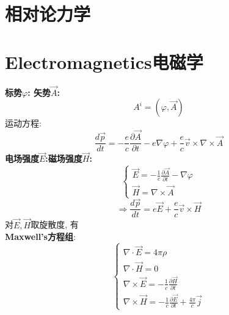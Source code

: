 \documentclass{article}
\begin{document}
\section{相对论力学}



\section{Electromagnetics电磁学}

\textbf{标势$\varphi$: \quad 矢势$\vec A$:}
\[A^{i}=(\varphi,\vec A)\]
运动方程:
\[\frac{d\vec p}{dt} = - \frac{e}{c} \frac{\partial\vec A}{\partial t} - e \nabla \varphi + \frac{e}{c} \vec v \times \nabla \times \vec A\]
\textbf{电场强度$\vec E$:\quad 磁场强度$\vec H$:}
\begin{displaymath}
    \left\{ \begin{array}{ll}
    \vec E = -\frac{1}{c} \frac{\partial \vec A}{\partial t} - \nabla \varphi\\
    \vec H = \nabla \times \vec A
    \end{array} \right.
\end{displaymath}
\[\Rightarrow \frac{d\vec p}{dt} = e \vec E + \frac{e}{c} \vec v \times \vec H\]
对$\vec E,\vec H$取旋散度, 有\\
\textbf{Maxwell's方程组}:
\begin{displaymath}
    \left\{ \begin{array}{ll}
    \nabla \cdot \vec E = 4\pi\rho\\
    \nabla \cdot \vec H = 0\\
    \nabla \times \vec E = - \frac{1}{c} \frac{\partial \vec H}{\partial t}\\
    \nabla \times \vec H = - \frac{1}{c} \frac{\partial \vec E}{\partial t} + \frac{4\pi}{c}\vec j
    \end{array} \right.
\end{displaymath}
\end{document}
